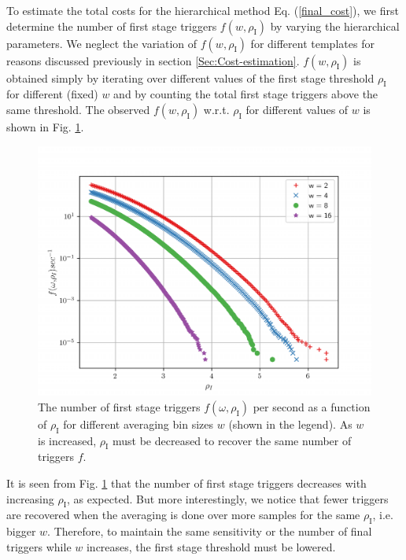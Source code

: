 To estimate the total costs for the hierarchical method Eq. (\ref{final_cost}), we first determine the number of first stage triggers $f(w, \rho_{\text{I}})$ by varying the hierarchical parameters. We neglect the variation of $f(w, \rho_{\text{I}})$ for different templates for reasons discussed previously in section \ref{Sec:Cost-estimation}. $f(w, \rho_{\text{I}})$ is obtained simply by iterating over different values of the first stage threshold $\rho_{\text{I}}$ for different (fixed) $w$ and by counting the total first stage triggers above the same threshold. The observed $f(w, \rho_{\text{I}})$ w.r.t. $\rho_{\text{I}}$ for different values of $w$ is shown in Fig. \ref{Triggers_vs_cutoff}.
\begin{figure}
    \centering
    \includegraphics[width=\linewidth]{figures/Hierarchical_MF/Triggers_vs_cutoff.pdf}
    \caption{The number of first stage triggers $f(\omega, \rho_{\text{I}})$ per second as a function of $\rho_{\text{I}}$ for different averaging bin sizes $w$ (shown in the legend). As $w$ is increased, $\rho_{\text{I}}$ must be decreased to recover the same number of triggers $f$.}
    \label{Triggers_vs_cutoff}
\end{figure}

It is seen from Fig. \ref{Triggers_vs_cutoff} that the number of first stage triggers decreases with increasing $\rho_{\text{I}}$, as expected. But more interestingly, we notice that fewer triggers are recovered when the averaging is done over more samples for the same $\rho_{\text{I}}$, i.e. bigger $w$.  Therefore, to maintain the same sensitivity or the number of final triggers while $w$ increases, the first stage threshold must be lowered. 

